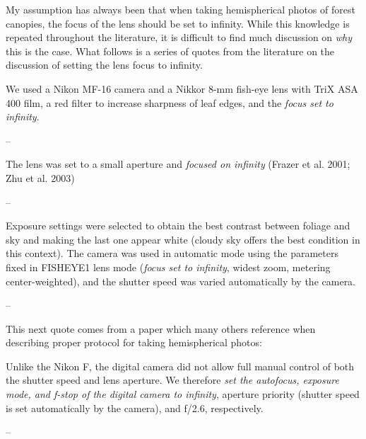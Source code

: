 \documentclass[11pt,a4paper]{article}
\begin{document}
My assumption has always been that when taking hemispherical photos of forest canopies, the focus of the lens should be set to infinity. While this knowledge is repeated throughout the literature, it is difficult to find much discussion on \textit{why} this is the case. What follows is a series of quotes from the literature on the discussion of setting the lens focus to infinity.

\begin{minipage}{\linewidth}
\begin{framed}
We used a Nikon MF-16 camera and a Nikkor 8-mm fish-eye lens with TriX ASA 400 film, a red filter to increase sharpness of leaf edges, and the \textit{focus set to infinity}.

-- \citealt{Englund2000}
\end{framed}
\end{minipage}

\begin{minipage}{\linewidth}
\begin{framed}
The lens was set to a small aperture and \textit{focused on infinity} (Frazer et al. 2001; Zhu et al. 2003)

-- \citealt{Hu2009}
\end{framed}
\end{minipage}

\begin{minipage}{\linewidth}
\begin{framed}
Exposure settings were selected to obtain the best contrast between foliage and sky and making the last one appear white (cloudy sky offers the best condition in this context). The camera was used in automatic mode using the parameters fixed in FISHEYE1 lens mode (\textit{focus set to infinity}, widest zoom, metering center-weighted), and the shutter speed was varied automatically by the camera.

-- \citealt{Paletto2009}
\end{framed}
\end{minipage}

This next quote comes from a paper which many others reference when describing proper protocol for taking hemispherical photos: 

\begin{minipage}{\linewidth}
\begin{framed}
Unlike the Nikon F, the digital camera did not allow full manual control of both the shutter speed and lens aperture. We therefore \textit{set the autofocus, exposure mode, and f-stop of the digital camera to infinity}, aperture priority (shutter speed is set automatically by the camera), and f/2.6, respectively. 

-- \citealt{Frazer2001}
\end{framed}
\end{minipage}
\end{document}
